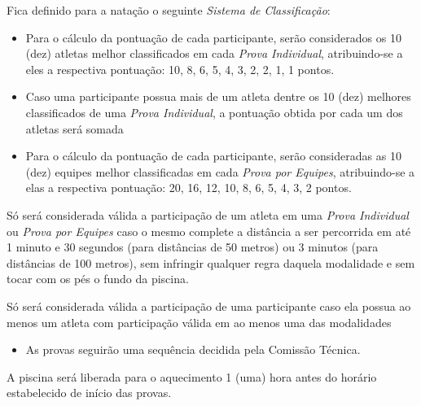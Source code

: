 \noindent
Fica definido para a natação o seguinte \textit{Sistema de Classificação}:
\begin{itemize}[noitemsep]
	\item Para o cálculo da pontuação de cada participante, serão considerados os 10 (dez) atletas melhor classificados em cada \textit{Prova Individual}, atribuindo-se a eles a respectiva pontuação: 10, 8, 6, 5, 4, 3, 2, 2, 1, 1 pontos.
	\item Caso uma participante possua mais de um atleta dentre os 10 (dez) melhores classificados de uma \textit{Prova Individual}, a pontuação obtida por cada um dos atletas será somada
	\item Para o cálculo da pontuação de cada participante, serão consideradas as 10 (dez) equipes melhor	classificadas em cada \textit{Prova por Equipes}, atribuindo-se a elas a respectiva pontuação: 20, 16, 12, 10, 8, 6, 5, 4, 3, 2 pontos.
\end{itemize}

\noindent
Só será considerada válida a participação de um atleta em uma \textit{Prova Individual} ou \textit{Prova por Equipes} caso o mesmo complete a distância a ser percorrida em até 1 minuto e 30 segundos (para distâncias de 50 metros) ou 3 minutos (para distâncias de 100 metros), sem infringir qualquer regra daquela modalidade e sem tocar com os pés o fundo da piscina.

\noindent
Só será considerada válida a participação de uma participante caso ela possua ao menos um atleta com participação válida em ao menos uma das modalidades
\begin{itemize}[noitemsep]
	\item As provas seguirão uma sequência decidida pela Comissão Técnica.
\end{itemize}

\begin{article}
	A piscina será liberada para o aquecimento 1 (uma) hora antes do horário estabelecido de início das provas.
\end{article}
